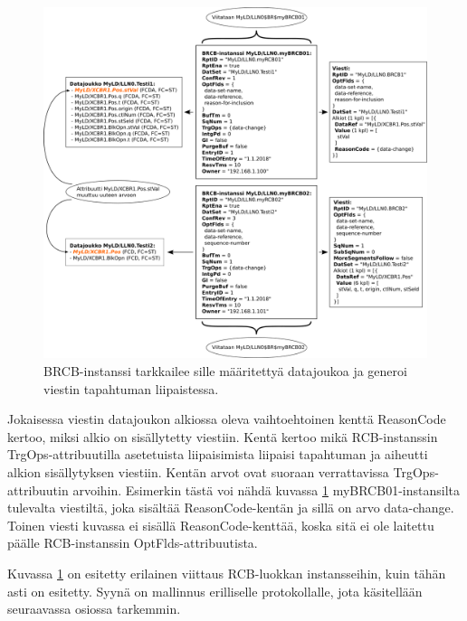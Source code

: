\begin{figure}[ht!]
	\includegraphics[width=1\textwidth]{pictures/iec61850-data-set-reporting.png}
	\caption{BRCB-instanssi tarkkailee sille määritettyä datajoukoa ja generoi viestin tapahtuman liipaistessa.}
	\label{fig:iec61850-data-set-reporting}
\end{figure}

Jokaisessa viestin datajoukon alkiossa oleva vaihtoehtoinen kenttä ReasonCode kertoo, miksi alkio on sisällytetty viestiin. Kentä kertoo mikä RCB-instanssin TrgOps-attribuutilla asetetuista liipaisimista liipaisi tapahtuman ja aiheutti alkion sisällytyksen viestiin. Kentän arvot ovat suoraan verrattavissa TrgOps-attribuutin arvoihin. Esimerkin tästä voi nähdä kuvassa \ref{fig:iec61850-data-set-reporting} myBRCB01-instansilta tulevalta viestiltä, joka sisältää ReasonCode-kentän ja sillä on arvo data-change. Toinen viesti kuvassa ei sisällä ReasonCode-kenttää, koska sitä ei ole laitettu päälle RCB-instanssin OptFlds-attribuutista.\cite[s.~28--29]{IEC61850-7-2}

Kuvassa \ref{fig:iec61850-data-set-reporting} on esitetty erilainen viittaus RCB-luokkan instansseihin, kuin tähän asti on esitetty. Syynä on mallinnus erilliselle protokollalle, jota käsitellään seuraavassa osiossa tarkemmin.


